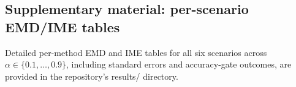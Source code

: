 \documentclass[pdflatex,sn-mathphys-num]{sn-jnl}
\theoremstyle{thmstyleone}
\theoremstyle{thmstyletwo}%
\theoremstyle{thmstylethree}%
\begin{document}
\begin{appendices}

\section{Supplementary material: per-scenario EMD/IME tables}
Detailed per-method EMD and IME tables for all six scenarios across $\alpha\in\{0.1,\dots,0.9\}$, including standard errors and accuracy-gate outcomes, are provided in the repository's results/ directory.

\end{appendices}


\end{document}
